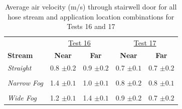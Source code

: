 \documentclass[12pt,oneside]{book}
\begin{document}




\begin{table}[!ht]
\caption{Average air velocity (m/s) through stairwell door for all hose stream and application location combinations for Tests 16 and 17}
\begin{tabular}{lcccc}
\toprule
 & \multicolumn{2}{c}{\underline{Test 16}} & \multicolumn{2}{c}{\underline{Test 17}}
\\
\textbf{Stream} & \textbf{Near} & \textbf{Far} & \textbf{Near} & \textbf{Far} \\
\midrule
\textit{Straight} & 
0.8 $\pm 0.2$ & 0.9 $\pm 0.2$ & 
0.7 $\pm 0.1$ & 0.7 $\pm 0.2$
\\	\multicolumn{5}{c}{}	\\
\textit{Narrow Fog} & 
1.4 $\pm 0.1$ & 1.0 $\pm 0.1$ & 
0.8 $\pm 0.2$ & 0.8 $\pm 0.1 $          
\\	\multicolumn{5}{c}{}	\\
\textit{Wide Fog} 	& 
1.2 $\pm 0.1$ & 1.4 $\pm 0.1$ & 
0.9 $\pm 0.2$ & 0.7 $\pm 0.2$
\\
\bottomrule
\end{tabular}
\label{table:Tests_16_17_BDP_A10_Avgs}
\end{table}
\end{document}
